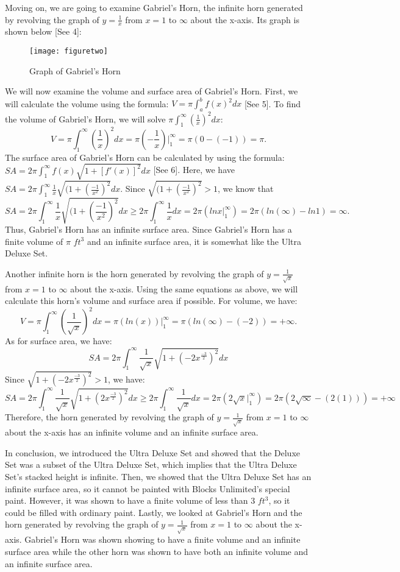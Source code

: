 \documentclass[12pt]{article}
\begin{document}
Moving on, we are going to examine Gabriel's Horn, the infinite horn generated by revolving the graph of $y=\frac1x$ from $x=1$ to $\infty$ about the x-axis. Its graph is shown below [See 4]:

\begin{figure}[H]
	\caption{Graph of Gabriel's Horn} 
	\texttt{[image: figuretwo]}\centering
\end{figure}

We will now examine the volume and surface area of Gabriel's Horn. First, we will calculate the volume using the formula: $V=\pi\int_a^{b}{f(x)^2}dx$ [See 5]. To find the volume of Gabriel's Horn, we will solve $\pi\int_1^{\infty}{(\frac1x)^2}dx$:
\[
	V=\pi\int_1^{\infty}{(\frac1x)^2}dx=\pi(-\frac1x)|_1^\infty=\pi(0-(-1))=\pi.
\]
The surface area of Gabriel's Horn can be calculated by using the formula: 
\newline $SA = 2\pi\int_1^{\infty}f(x){\sqrt{1+[f'(x)]^2}}dx$ [See 6]. Here, we have $SA = 2\pi\int_1^{\infty}{\frac1x}\sqrt{(1+(\frac{-1}{x^2})^2}dx$. Since $\sqrt{(1+(\frac{-1}{x^2})^2}>1$, we know that  
\[
	SA = 2\pi\int_1^{\infty}{\frac1x}\sqrt{(1+(\frac{-1}{x^2})^2}dx\geq2\pi\int_1^{\infty}{\frac1x}dx=2\pi(lnx|_1^{\infty})=2\pi(ln(\infty)-ln1)=\infty.
\]
Thus, Gabriel's Horn has an infinite surface area. Since Gabriel's Horn has a finite volume of $\pi$ $ft^3$ and an infinite surface area, it is somewhat like the Ultra Deluxe Set. 

Another infinite horn is the horn generated by revolving the graph of $y=\frac1{\sqrt{x}}$ from $x=1$ to $\infty$ about the x-axis. Using the same equations as above, we will calculate this horn's volume and surface area if possible. For volume, we have:
\[
	V=\pi\int_1^{\infty}(\frac{1}{\sqrt{x}})^{2}dx=\pi(ln(x))|_1^{\infty}=\pi(ln(\infty)-(-2))=+\infty.
\]
As for surface area, we have:
\[
	SA=2\pi\int_1^{\infty}{\frac{1}{\sqrt{x}}}{\sqrt{1+(-2x^{\frac{-3}{2}})^2}}dx
\]
Since $\sqrt{1+(-2x^{\frac{-3}{2}})^2}>1$, we have:
\[
	SA=2\pi\int_1^{\infty}{\frac{1}{\sqrt{x}}}{\sqrt{1+(2x^\frac{-3}{2})^2}}dx\geq2\pi\int_1^{\infty}{\frac{1}{\sqrt{x}}}dx=2\pi(2\sqrt{x}|_1^{\infty})=2\pi(2\sqrt{\infty}-(2(1)))=+\infty
\]
Therefore, the horn generated by revolving the graph of $y=\frac1{\sqrt{x}}$ from $x=1$ to $\infty$ about the x-axis has an infinite volume and an infinite surface area.

In conclusion, we introduced the Ultra Deluxe Set and showed that the Deluxe Set was a subset of the Ultra Deluxe Set, which implies that the Ultra Deluxe Set's stacked height is infinite. Then, we showed that the Ultra Deluxe Set has an infinite surface area, so it cannot be painted with Blocks Unlimited's special paint. However, it was shown to have a finite volume of less than 3 $ft^3$, so it could be filled with ordinary paint. Lastly, we looked at Gabriel's Horn and the horn generated by revolving the graph of $y=\frac1{\sqrt{x}}$ from $x=1$ to $\infty$ about the x-axis. Gabriel's Horn was shown showing to have a finite volume and an infinite surface area while the other horn was shown to have both an infinite volume and an infinite surface area.
\end{document}
